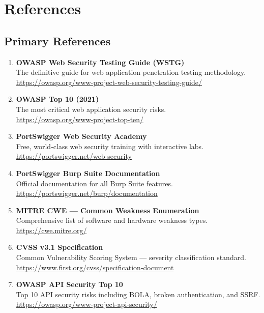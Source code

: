 \chapter*{References}
\label{ch:references}

\section*{Primary References}

\begin{enumerate}

\item \textbf{OWASP Web Security Testing Guide (WSTG)}\\
The definitive guide for web application penetration testing methodology.\\
\url{https://owasp.org/www-project-web-security-testing-guide/}

\item \textbf{OWASP Top 10 (2021)}\\
The most critical web application security risks.\\
\url{https://owasp.org/www-project-top-ten/}

\item \textbf{PortSwigger Web Security Academy}\\
Free, world-class web security training with interactive labs.\\
\url{https://portswigger.net/web-security}

\item \textbf{PortSwigger Burp Suite Documentation}\\
Official documentation for all Burp Suite features.\\
\url{https://portswigger.net/burp/documentation}

\item \textbf{MITRE CWE — Common Weakness Enumeration}\\
Comprehensive list of software and hardware weakness types.\\
\url{https://cwe.mitre.org/}

\item \textbf{CVSS v3.1 Specification}\\
Common Vulnerability Scoring System — severity classification standard.\\
\url{https://www.first.org/cvss/specification-document}

\item \textbf{OWASP API Security Top 10}\\
Top 10 API security risks including BOLA, broken authentication, and SSRF.\\
\url{https://owasp.org/www-project-api-security/}

\end{enumerate}

